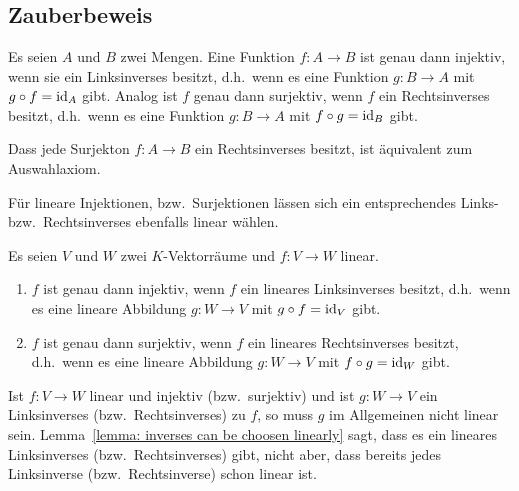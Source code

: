 \section{}

\subsection{Zauberbeweis}

\begin{recall}
  Es seien $A$ und $B$ zwei Mengen.
  Eine Funktion $f \colon A \to B$ ist genau dann injektiv, wenn sie ein Linksinverses besitzt, d.h.\ wenn es eine Funktion $g \colon B \to A$ mit $g \circ f = \operatorname{id}_A$ gibt.
  Analog ist $f$ genau dann surjektiv, wenn $f$ ein Rechtsinverses besitzt, d.h.\ wenn es eine Funktion $g \colon B \to A$ mit $f \circ g = \operatorname{id}_B$ gibt.
\end{recall}

\begin{remark}
  Dass jede Surjekton $f \colon A \to B$ ein Rechtsinverses besitzt, ist äquivalent zum Auswahlaxiom.
\end{remark}

Für lineare Injektionen, bzw.\ Surjektionen lässen sich ein entsprechendes Links- bzw.\ Rechtsinverses ebenfalls linear wählen.

\begin{lemma}
  \label{lemma: inverses can be choosen linearly}
  Es seien $V$ und $W$ zwei $K$-Vektorräume und $f \colon V \to W$ linear.
  \begin{enumerate}
    \item
      $f$ ist genau dann injektiv, wenn $f$ ein lineares Linksinverses besitzt, d.h.\ wenn es eine lineare Abbildung $g \colon W \to V$ mit $g \circ f = \operatorname{id}_V$ gibt.
    \item
      $f$ ist genau dann surjektiv, wenn $f$ ein lineares Rechtsinverses besitzt, d.h.\ wenn es eine lineare Abbildung $g \colon W \to V$ mit $f \circ g = \operatorname{id}_W$ gibt.
  \end{enumerate}
\end{lemma}

\begin{warning}
  Ist $f \colon V \to W$ linear und injektiv (bzw.\ surjektiv) und ist $g \colon W \to V$ ein Linksinverses (bzw.\ Rechtsinverses) zu $f$, so muss $g$ im Allgemeinen nicht linear sein.
  Lemma~\ref{lemma: inverses can be choosen linearly} sagt, dass es ein lineares Linksinverses (bzw.\ Rechtsinverses) gibt, nicht aber, dass bereits jedes Linksinverse (bzw.\ Rechtsinverse) schon linear ist.
\end{warning}

